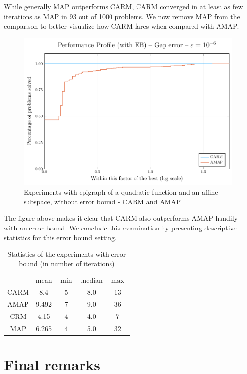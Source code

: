 \documentclass[smallextended,numbook,nospthms]{svjour3}
\theoremstyle{plain}
\theoremstyle{definition}
\begin{document}
While generally MAP outperforms CARM, CARM converged in at least as few iterations as MAP in 93 out of 1000 problems. We now remove MAP from the comparison to better visualize how CARM fares when compared with AMAP.

\begin{figure}[h!]
	\centering
	\includegraphics[scale=0.7]{fig3EB}
	\caption{Experiments with epigraph of a quadratic function and an affine subspace, without error bound - CARM and AMAP}
	\label{fig:perprof EB 3}
\end{figure}

The figure above makes it clear that CARM also outperforms AMAP handily with an error bound. We conclude this examination by presenting descriptive statistics for this error bound setting.

\begin{table}[h!]
	\centering
	\begin{tabular}{ccccc}
		\hline & mean & $\min$ & median & $\max$ \\
		\cline { 2 - 5 } CARM & 8.4 & 5 & 8.0 & 13 \\
		AMAP & 9.492 & 7 & 9.0 & 36 \\
		CRM & 4.15 & 4 & 4.0 & 7 \\
		MAP & 6.265 & 4 & 5.0 & 32 \\
		\hline
	\end{tabular}
	\caption{Statistics of the experiments with error bound (in number of iterations)}
	\label{table:perprof EB}
\end{table}

\newpage
\section{Final remarks}\label{sec:remarks}
\end{document}
